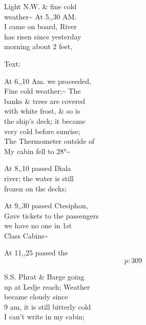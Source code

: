 \documentclass{report}
\begin{document}




	\par{
 	Light N.W. \& fine cold\ \\weather\~{} At 5,,30 AM.\ \\I came on board, River\ \\has risen since yesterday\ \\morning about 2 feet,\ \\
	}

	\par{
 	Text:\ \\
	}

	\par{
 	At 6,,10 Am. we proceeded,\ \\Fine cold weather;\~{} The\ \\banks \& trees are covered\ \\with white frost, \& so is\ \\the ship’s deck; it became\ \\very cold before sunrise;\ \\The Thermometer outsîde of\ \\My cabin fell to 28°\~{}\ \\
	}

	\par{
 	At 8,,10 passed Diala\ \\river; the water is still\ \\frozen on the decks;\ \\
	}

	\par{
 	At 9,,30 passed Ctesiphon,\ \\Gave tickets to the passengers\ \\we have no one in 1st\ \\Class Cabins\~{}\ \\
	}

	\par{
 	At 11,,25 passed the\ \\
  \[p: 309 \]

	}


	\par{
 	S.S. Phrat \& Barge going\ \\up at Ledje reach; Weather\ \\became cloudy since\ \\9 am, it is still bitterly cold\ \\I can’t write in my cabin;\ \\
	}
\end{document}
